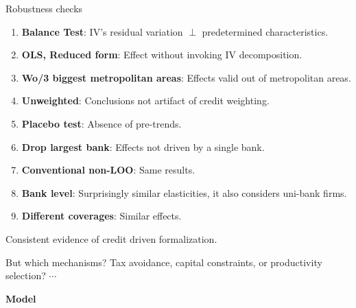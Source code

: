 \documentclass[aspectratio=169]{beamer}
\begin{document}

\begin{frame}{Robustness checks}\label{robustness}

\begin{enumerate}
    \item \textbf{Balance Test}: IV's residual variation $\perp$ predetermined characteristics. \hyperlink{balance}{}
    \vspace{1mm}
    \pause
    \item \textbf{OLS, Reduced form}: Effect without invoking IV decomposition. \hyperlink{ols}{}
    \vspace{1mm}
    \pause
    \item \textbf{Wo/3 biggest metropolitan areas}: Effects valid out of metropolitan areas. \hyperlink{womet}{}
    \vspace{1mm}
    \pause
    \item \textbf{Unweighted}: Conclusions not artifact of credit weighting. \hyperlink{unweighted}{}
    \vspace{1mm}
    \pause
    \item \textbf{Placebo test}: Absence of pre-trends. \hyperlink{placebo}{}
    \vspace{1mm}
    \pause
    \item \textbf{Drop largest bank}: Effects not driven by a single bank. \hyperlink{dropbank}{}
    \vspace{1mm}
    \pause
    \item \textbf{Conventional non-LOO}: Same results. \hyperlink{nonloo}{}
    \vspace{1mm}
    \pause
    \item \textbf{Bank level}: Surprisingly similar elasticities, it also considers uni-bank firms. \hyperlink{banklevel}{}
    \vspace{1mm}
    \pause
    \item \textbf{Different coverages}: Similar effects. \hyperlink{coverage}{}
\end{enumerate}

\begin{center}
    \Large Consistent evidence of credit driven formalization.
\end{center}
\pause

But which mechanisms? Tax avoidance, capital constraints, or productivity selection? $\cdots$ 

\begin{center}
    \Large \textbf{Model}
\end{center}

\end{frame}
\end{document}
